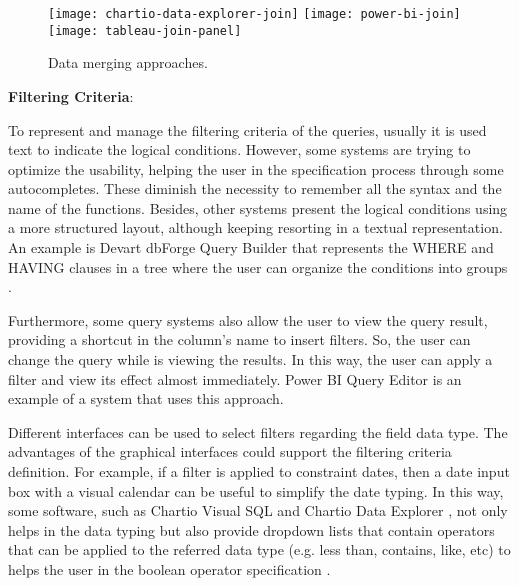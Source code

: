 \begin{figure}[htbp]
    \centering
      {\texttt{[image: chartio-data-explorer-join]}}%
    {\texttt{[image: power-bi-join]}}%
    \\
      {\texttt{[image: tableau-join-panel]}}%
  \caption{Data merging approaches.}
    \label{fig:approaches_select_data_sources}
\end{figure}

\textbf{Filtering Criteria}: 

To represent and manage the filtering criteria of the queries, usually it is used text to indicate the logical conditions. However, some systems are trying to optimize the usability, helping the user in the specification process through some autocompletes. These diminish the necessity to remember all the syntax and the name of the functions. 
Besides, other systems present the logical conditions using a more structured layout, although keeping resorting in a textual representation. An example is Devart dbForge Query Builder \cite{dbForgeQueryBuilder} that represents the WHERE and HAVING clauses in a tree where the user can organize the conditions into groups \cite{dbForgeBuildingWhereOrHavingClause}.

Furthermore, some query systems also allow the user to view the query result, providing a shortcut in the column's name to insert filters. So, the user can change the query while is viewing the results. In this way, the user can apply a filter and view its effect almost immediately. Power BI Query Editor \cite{powerBI} is an example of a system that uses this approach.

Different interfaces can be used to select filters regarding the field data type. The advantages of the graphical interfaces could support the filtering criteria definition. For example, if a filter is applied to constraint dates, then a date input box with a visual calendar can be useful to simplify the date typing. In this way, some software, such as Chartio Visual SQL \cite{chartioVisualSQL} and Chartio Data Explorer \cite{chartioDataExplorer}, not only helps in the data typing but also provide dropdown lists that contain operators that can be applied to the referred data type (e.g. less than, contains, like, etc)  to helps the user in the boolean operator specification \cite{chartioDataExplorer,visualSqlActions}.

